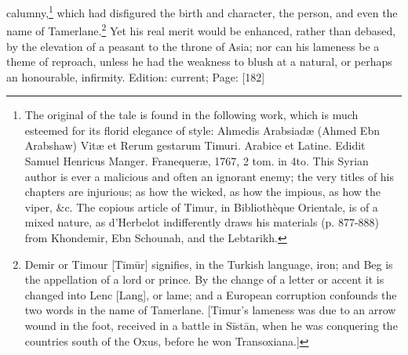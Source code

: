 calumny,\footnote{The original of the tale is found in the following work, which is much esteemed for its florid elegance of style: Ahmedis Arabsiadæ (Ahmed Ebn Arabshaw) Vitæ et Rerum gestarum Timuri. Arabice et Latine. Edidit Samuel Henricus Manger. Franequeræ, 1767, 2 tom. in 4to. This Syrian author is ever a malicious and often an ignorant enemy; the very titles of his chapters are injurious; as how the wicked, as how the impious, as how the viper, \&c. The copious article of Timur, in Bibliothèque Orientale, is of a mixed nature, as d\texthebrew{}’Herbelot indifferently draws his materials (p. 877-888) from Khondemir, Ebn Schounah, and the Lebtarikh.} which had disfigured the birth and character, the person, and even the name of Tamerlane.\footnote{Demir or Timour [Tīmūr] signifies, in the Turkish language, iron; and Beg is the appellation of a lord or prince. By the change of a letter or accent it is changed into Lenc [Lang], or lame; and a European corruption confounds the two words in the name of Tamerlane. [Timur\texthebrew{}’s lameness was due to an arrow wound in the foot, received in a battle in Sīstān, when he was conquering the countries south of the Oxus, before he won Transoxiana.]} Yet his real merit would be enhanced, rather than debased, by the elevation of a peasant to the throne of Asia; nor can his lameness be a theme of reproach, unless he had the weakness to blush at a natural, or perhaps an honourable, infirmity.
Edition: current; Page: [182]

